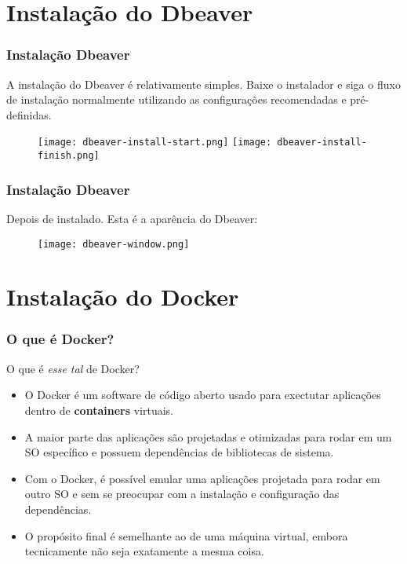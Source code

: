 \documentclass[t, 10pt, aspectratio=169, table, x11names]{beamer}
\begin{document}
	\section{Instalação do Dbeaver}

	\begin{frame}
		\frametitle{Instalação Dbeaver}
		A instalação do Dbeaver é relativamente simples. Baixe o instalador e siga o fluxo de instalação normalmente utilizando as configurações recomendadas e pré-definidas.
		\begin{figure}[h]
			\centering\vspace{2mm}
			\texttt{[image: dbeaver-install-start.png]}
			\hspace{0.5cm}
			\texttt{[image: dbeaver-install-finish.png]}
		\end{figure}
	\end{frame}
	
	\begin{frame}
		\frametitle{Instalação Dbeaver}
		Depois de instalado. Esta é a aparência do Dbeaver:
		\begin{figure}[h]
			\centering\vspace{2mm}
			\texttt{[image: dbeaver-window.png]}
		\end{figure}
	\end{frame}

	\section{Instalação do Docker}

	\begin{frame}
		\frametitle{O que é Docker?}
		O que é \textit{esse tal} de Docker?
		\vspace{3mm} 
		\begin{itemize}
			\item O Docker é um software de código aberto usado para exectutar aplicações dentro de \textbf{containers} virtuais.
			\vspace{2mm}
			\item A maior parte das aplicações são projetadas e otimizadas para rodar em um SO específico e possuem dependências de bibliotecas de sistema.
			\vspace{2mm}
			\item Com o Docker, é possível emular uma aplicações projetada para rodar em outro SO e sem se preocupar com a instalação e configuração das dependências.
			\vspace{2mm}
			\item O propósito final é semelhante ao de uma máquina virtual, embora tecnicamente não seja exatamente a mesma coisa.
		\end{itemize}
	\end{frame}
\end{document}
